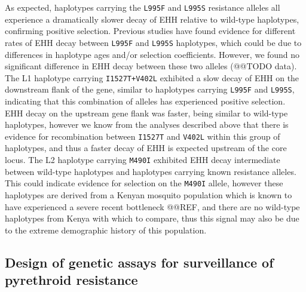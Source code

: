 \documentclass[a4paper,11pt,abstracton,hidelinks]{scrartcl}
\begin{document}
%
As expected, haplotypes carrying the \texttt{L995F} and \texttt{L995S} resistance alleles all experience a dramatically slower decay of EHH relative to wild-type haplotypes, confirming positive selection.
%
Previous studies have found evidence for different rates of EHH decay between \texttt{L995F} and \texttt{L995S} haplotypes, which could be due to differences in haplotype ages and/or selection coefficients.
%
However, we found no significant difference in EHH decay between these two alleles (@@TODO data).
%
The L1 haplotype carrying \texttt{I1527T+V402L} exhibited a slow decay of EHH on the downstream flank of the gene, similar to haplotypes carrying \texttt{L995F} and \texttt{L995S}, indicating that this combination of alleles has experienced positive selection.
%
EHH decay on the upstream gene flank was faster, being similar to wild-type haplotypes, however we know from the analyses described above that there is evidence for recombination between \texttt{I1527T} and \texttt{V402L} within this group of haplotypes, and thus a faster decay of EHH is expected upstream of the core locus. 
%
The L2 haplotype carrying \texttt{M490I} exhibited EHH decay intermediate between wild-type haplotypes and haplotypes carrying known resistance alleles.
%
This could indicate evidence for selection on the \texttt{M490I} allele, however these haplotypes are derived from a Kenyan mosquito population which is known to have experienced a severe recent bottleneck @@REF, and there are no wild-type haplotypes from Kenya with which to compare, thus this signal may also be due to the extreme demographic history of this population.


\subsection*{Design of genetic assays for surveillance of pyrethroid resistance}
\end{document}
